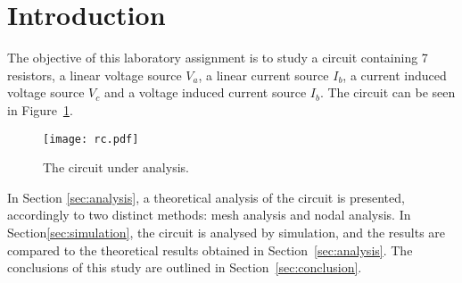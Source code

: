 \section{Introduction}
\label{sec:introduction}

The objective of this laboratory assignment is to study a circuit containing 7 resistors, a linear voltage source $V_a$, a linear current source $I_b$, a current induced voltage source $V_c$ and a voltage induced current source $I_b$. The circuit can be seen in Figure~\ref{fig:rc}.

\begin{figure}[h] \centering
\texttt{[image: rc.pdf]}
\caption{The circuit under analysis.}
\label{fig:rc}
\end{figure}\label{fig:rc}

In Section \ref{sec:analysis}, a theoretical analysis of the circuit is
presented, accordingly to two distinct methods: mesh analysis and nodal analysis. In Section\ref{sec:simulation}, the circuit is analysed by
simulation, and the results are compared to the theoretical results obtained in
Section~\ref{sec:analysis}. The conclusions of this study are outlined in
Section~\ref{sec:conclusion}.





